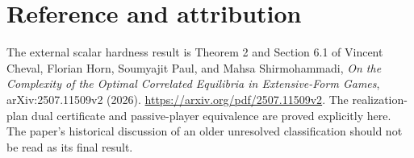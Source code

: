 \documentclass[11pt]{article}
\begin{document}
\section*{Reference and attribution}
The external scalar hardness result is Theorem 2 and Section 6.1 of
Vincent Cheval, Florian Horn, Soumyajit Paul, and Mahsa Shirmohammadi,
\emph{On the Complexity of the Optimal Correlated Equilibria in
Extensive-Form Games}, arXiv:2507.11509v2 (2026).
\url{https://arxiv.org/pdf/2507.11509v2}.
The realization-plan dual certificate and passive-player equivalence
are proved explicitly here. The paper's historical discussion of an
older unresolved classification should not be read as its final result.
\end{document}
